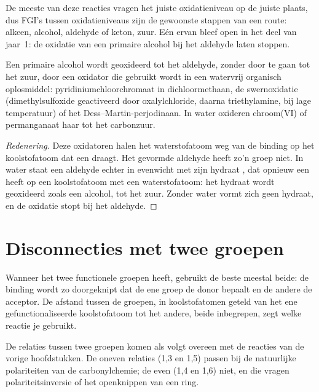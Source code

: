 De meeste van deze reacties vragen het juiste oxidatieniveau op de juiste plaats, dus FGI's tussen
oxidatieniveaus zijn de gewoonste stappen van een route: alkeen, alcohol, aldehyde of keton, zuur. Eén ervan bleef
open in het deel van jaar~1: de oxidatie van een primaire alcohol bij het aldehyde laten stoppen.

\begin{proposition}\label{prop:b2:retrosynthesis:mild-oxidation}
Een primaire alcohol wordt geoxideerd tot het aldehyde, zonder door te gaan tot het zuur, door een oxidator die gebruikt wordt in een
watervrij organisch oplosmiddel: pyridiniumchloorchromaat in dichloormethaan, de swernoxidatie
(dimethylsulfoxide geactiveerd door oxalylchloride, daarna triethylamine, bij lage temperatuur) of het
Dess--Martin-perjodinaan. In water oxideren chroom(VI) of permanganaat haar tot het carbonzuur.
\end{proposition}

\begin{proof}[Redenering]
Deze oxidatoren halen het waterstofatoom weg van de binding  op het koolstofatoom dat een  draagt. Het gevormde
aldehyde heeft zo'n groep niet. In water staat een aldehyde echter in evenwicht met zijn hydraat
, dat opnieuw een  heeft op een koolstofatoom met een waterstofatoom: het hydraat wordt geoxideerd
zoals een alcohol, tot het zuur. Zonder water vormt zich geen hydraat, en de oxidatie stopt bij het
aldehyde.
\end{proof}

\section{Disconnecties met twee groepen}

Wanneer het  twee functionele groepen heeft, gebruikt de beste  meestal beide: de binding wordt zo
doorgeknipt dat de ene groep de donor bepaalt en de andere de acceptor. De afstand tussen de groepen,
in koolstofatomen geteld van het ene gefunctionaliseerde koolstofatoom tot het andere, beide inbegrepen, zegt welke reactie je gebruikt.

\begin{proposition}\label{prop:b2:retrosynthesis:patterns}
De relaties tussen twee groepen komen als volgt overeen met de reacties van de vorige hoofdstukken. De
oneven relaties (1,3 en 1,5) passen bij de natuurlijke polariteiten van de carbonylchemie; de even (1,4
en 1,6) niet, en die vragen polariteitsinversie of het openknippen van een ring.
\end{proposition}


